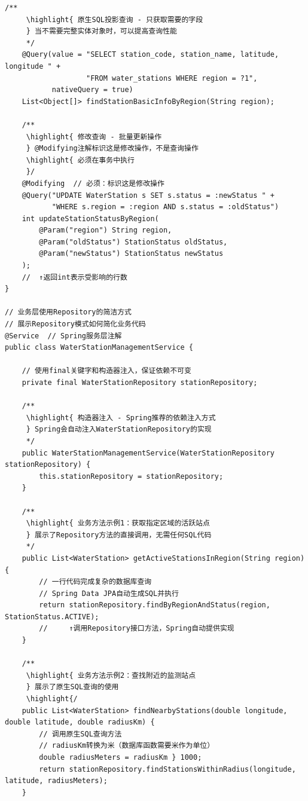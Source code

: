 \begin{lstlisting}[style=java]
    /**
     \highlight{ 原生SQL投影查询 - 只获取需要的字段
     } 当不需要完整实体对象时，可以提高查询性能
     */
    @Query(value = "SELECT station_code, station_name, latitude, longitude " +
                   "FROM water_stations WHERE region = ?1", 
           nativeQuery = true)
    List<Object[]> findStationBasicInfoByRegion(String region);
    
    /**
     \highlight{ 修改查询 - 批量更新操作
     } @Modifying注解标识这是修改操作，不是查询操作
     \highlight{ 必须在事务中执行
     }/
    @Modifying  // 必须：标识这是修改操作
    @Query("UPDATE WaterStation s SET s.status = :newStatus " +
           "WHERE s.region = :region AND s.status = :oldStatus")
    int updateStationStatusByRegion(
        @Param("region") String region,
        @Param("oldStatus") StationStatus oldStatus,
        @Param("newStatus") StationStatus newStatus
    );
    //  ↑返回int表示受影响的行数
}

// 业务层使用Repository的简洁方式
// 展示Repository模式如何简化业务代码
@Service  // Spring服务层注解
public class WaterStationManagementService {
    
    // 使用final关键字和构造器注入，保证依赖不可变
    private final WaterStationRepository stationRepository;
    
    /**
     \highlight{ 构造器注入 - Spring推荐的依赖注入方式
     } Spring会自动注入WaterStationRepository的实现
     */
    public WaterStationManagementService(WaterStationRepository stationRepository) {
        this.stationRepository = stationRepository;
    }
    
    /**
     \highlight{ 业务方法示例1：获取指定区域的活跃站点
     } 展示了Repository方法的直接调用，无需任何SQL代码
     */
    public List<WaterStation> getActiveStationsInRegion(String region) {
        // 一行代码完成复杂的数据库查询
        // Spring Data JPA自动生成SQL并执行
        return stationRepository.findByRegionAndStatus(region, StationStatus.ACTIVE);
        //     ↑调用Repository接口方法，Spring自动提供实现
    }
    
    /**
     \highlight{ 业务方法示例2：查找附近的监测站点
     } 展示了原生SQL查询的使用
     \highlight{/
    public List<WaterStation> findNearbyStations(double longitude, double latitude, double radiusKm) {
        // 调用原生SQL查询方法
        // radiusKm转换为米（数据库函数需要米作为单位）
        double radiusMeters = radiusKm } 1000;
        return stationRepository.findStationsWithinRadius(longitude, latitude, radiusMeters);
    }
    

\end{lstlisting}
